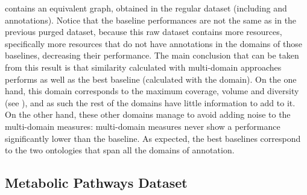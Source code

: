  contains an equivalent graph, obtained in the regular dataset (including  and  annotations). Notice that the baseline performances are not the same as in the previous purged dataset, because this raw dataset contains more resources, specifically more resources that do not have annotations in the domains of those baselines, decreasing their performance. The main conclusion that can be taken from this result is that similarity calculated with multi-domain approaches performs as well as the best baseline (calculated with the  domain). On the one hand, this domain corresponds to the maximum coverage, volume and diversity (see ), and as such the rest of the domains have little information to add to it. On the other hand, these other domains manage to avoid adding noise to the multi-domain measures: multi-domain measures never show a performance significantly lower than the  baseline. As expected, the best baselines correspond to the two ontologies that span all the domains of annotation.


\subsection{Metabolic Pathways Dataset} \label{sub:results/pathways}

